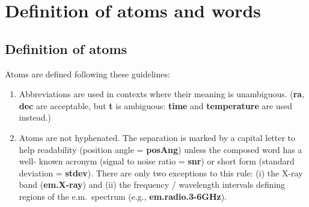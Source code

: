 \documentclass[11pt,a4paper]{ivoa}
\def\ucd{\begingroup\tt}
\def\enducd{\endgroup}
\gdef\breakabledot{\discretionary{...}{...}{.}}
\gdef\ucd{\begingroup\tt\catcode`\.=\active\let.=\breakabledot}
\gdef\enducd{\endgroup}
\def\ucd{\begingroup\tt}
\def\enducd{\endgroup}
\gdef\breakabledot{\discretionary{...}{...}{.}}
\gdef\ucd{\begingroup\tt\catcode`\.=\active\let.=\breakabledot}
\gdef\enducd{\endgroup}
\begin{document}

\appendix

\section{Definition of atoms and words}

\subsection{Definition of atoms}
Atoms are defined following these guidelines:
\begin{enumerate}
\item Abbreviations are used in contexts where their meaning is unambiguous. ({\bf ra}, {\bf dec} are 
acceptable, but {\bf t} is ambiguous: {\bf time} and {\bf temperature} are used instead.)
\item Atoms are not hyphenated. The separation is marked by a capital letter to help readability 
(position angle = {\bf posAng}) unless the composed word has a well- known acronym (signal to noise ratio = 
{\bf snr}) or short form (standard deviation = {\bf stdev}). There are only two exceptions to this rule: 
(i) the X-ray band ({\bf em.X-ray}) and (ii) the frequency / wavelength intervals defining regions of the 
e.m.~spectrum (e.g., {\bf em.radio.3-6GHz}).
\end{enumerate}
\end{document}
